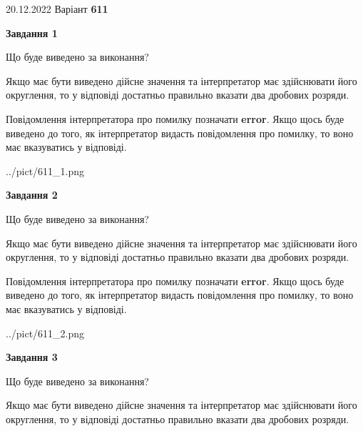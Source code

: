 \documentclass[12pt, ukrainian]{article}
\begin{document}
{20.12.2022 Варіант \No \textbf { 611 }\par}
{
\begin {Large}

{\begin {center}\textbf{Завдання 1}\end {center}}\par
Що буде виведено за виконання? \par

Якщо має бути виведено дійсне значення та інтерпретатор має здійснювати його округлення, 
то у відповіді достатньо правильно вказати два дробових розряди.

Повідомлення інтерпретатора про помилку позначати \textbf{error}.
Якщо щось буде виведено до того, як інтерпретатор видасть повідомлення про помилку, 
то воно має вказуватись у відповіді. \par

\begin{center}
	{../pict/611_1.png}
\end{center}
\newpage

{\begin {center}\textbf{Завдання 2}\end {center}}\par
Що буде виведено за виконання? \par

Якщо має бути виведено дійсне значення та інтерпретатор має здійснювати його округлення, 
то у відповіді достатньо правильно вказати два дробових розряди.

Повідомлення інтерпретатора про помилку позначати \textbf{error}.
Якщо щось буде виведено до того, як інтерпретатор видасть повідомлення про помилку, 
то воно має вказуватись у відповіді. \par

\begin{center}
	{../pict/611_2.png}
\end{center}
\newpage

{\begin {center}\textbf{Завдання 3}\end {center}}\par
Що буде виведено за виконання? \par

Якщо має бути виведено дійсне значення та інтерпретатор має здійснювати його округлення, 
то у відповіді достатньо правильно вказати два дробових розряди.


\end{Large}}
\end{document}
